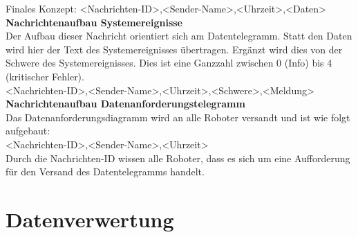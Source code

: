 \documentclass[ a4paper,
                oneside,
                toc=bibliography,
                toc=listof
                ]{scrbook}
\begin{document}
	Finales Konzept: <Nachrichten-ID>,<Sender-Name>,<Uhrzeit>,<Daten> \\
	\textbf{Nachrichtenaufbau Systemereignisse}\\
	Der Aufbau dieser Nachricht orientiert sich am Datentelegramm. Statt den Daten wird hier der Text des Systemereignisses übertragen. Ergänzt wird dies von der Schwere des Systemereignisses. Dies ist eine Ganzzahl zwischen 0 (Info) bis 4 (kritischer Fehler). \\
	<Nachrichten-ID>,<Sender-Name>,<Uhrzeit>,<Schwere>,<Meldung>\\
	\textbf{Nachrichtenaufbau Datenanforderungstelegramm}\\
	Das Datenanforderungsdiagramm wird an alle Roboter versandt und ist wie folgt aufgebaut:\\
	<Nachrichten-ID>,<Sender-Name>,<Uhrzeit>\\
	Durch die Nachrichten-ID wissen alle Roboter, dass es sich um eine Aufforderung für den Versand des Datentelegramms handelt.
	\section{Datenverwertung}
	
\end{document}
